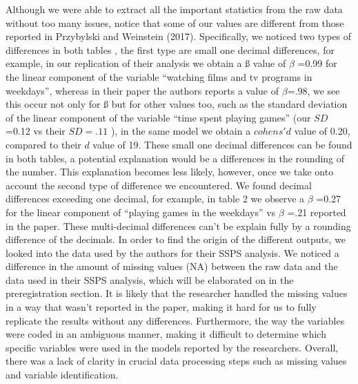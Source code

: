 \documentclass[floatsintext,man]{apa6}
\theoremstyle{definition}
\theoremstyle{definition}
\theoremstyle{definition}
\theoremstyle{remark}
\begin{document}
Although we were able to extract all the important statistics from the
raw data without too many issues, notice that some of our values are
different from those reported in Przybylski and Weinstein (2017).
Specifically, we noticed two types of differences in both tables , the
first type are small one decimal differences, for example, in our
replication of their analysis we obtain a ß value of \(\beta\) =0.99 for
the linear component of the variable \enquote{watching films and tv
programs in weekdays}, whereas in their paper the authors reports a
value of \(\beta\)=.98, we see this occur not only for ß but for other
values too, such as the standard deviation of the linear component of
the variable \enquote{time spent playing games} (our \(SD\) =0.12 vs
their \(SD =.11\) ), in the same model we obtain a \(cohens'd\) value of
0.20, compared to their \(d\) value of 19. These small one decimal
differences can be found in both tables, a potential explanation would
be a differences in the rounding of the number. This explanation becomes
less likely, however, once we take onto account the second type of
difference we encountered. We found decimal differences exceeding one
decimal, for example, in table 2 we observe a \(\beta\) =0.27 for the
linear component of \enquote{playing games in the weekdays} vs \(\beta\)
=.21 reported in the paper. These multi-decimal differences can't be
explain fully by a rounding difference of the decimals. In order to find
the origin of the different outputs, we looked into the data used by the
authors for their SSPS analysis. We noticed a difference in the amount
of missing values (NA) between the raw data and the data used in their
SSPS analysis, which will be elaborated on in the preregistration
section. It is likely that the researcher handled the missing values in
a way that wasn't reported in the paper, making it hard for us to fully
replicate the results without any differences. Furthermore, the way the
variables were coded in an ambiguous manner, making it difficult to
determine which specific variables were used in the models reported by
the researchers. Overall, there was a lack of clarity in crucial data
processing steps such as missing values and variable identification.
\end{document}
